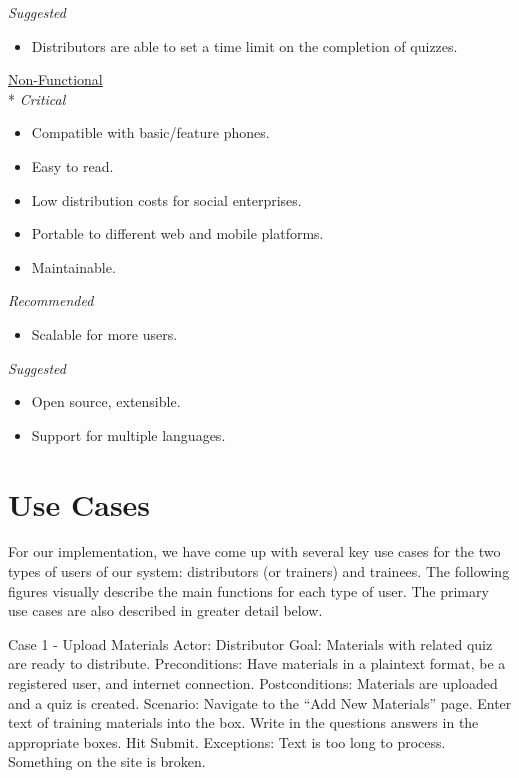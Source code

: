 \textit{Suggested}
\begin{itemize}
\item Distributors are able to set a time limit on the completion of quizzes.\\[-0.5\baselineskip]
\end{itemize}

\underline{Non-Functional}\\*
\textit{Critical}
\begin{itemize}
\item Compatible with basic/feature phones.
\item Easy to read.
\item Low distribution costs for social enterprises.
\item Portable to different web and mobile platforms.
\item Maintainable.
\end{itemize}

\textit{Recommended}
\begin{itemize}
\item Scalable for more users.
\end{itemize}

\textit{Suggested}
\begin{itemize}
\item Open source, extensible.
\item Support for multiple languages.
\end{itemize}

\section{Use Cases}
For our implementation, we have come up with several key use cases for the two types of users of our system: distributors (or trainers) and trainees. The following figures visually describe the main functions for each type of user. The primary use cases are also described in greater detail below.

Case 1 - Upload Materials
Actor: Distributor
Goal: Materials with related quiz are ready to distribute.
Preconditions: Have materials in a plaintext format, be a registered user, and internet connection.
Postconditions: Materials are uploaded and a quiz is created.
Scenario: 
Navigate to the “Add New Materials” page.
Enter text of training materials into the box.
Write in the questions answers in the appropriate boxes.
Hit Submit.
Exceptions:
Text is too long to process.
Something on the site is broken.

